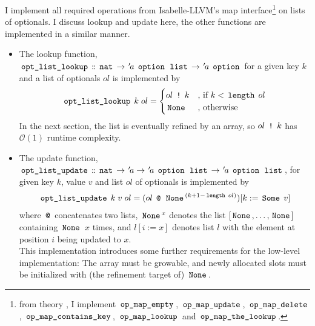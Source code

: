 I implement all required operations from Isabelle-LLVM's map interface\footnote{from theory , I implement $\,\text{\ttfamily op\_map\_empty}\,$, $\,\text{\ttfamily op\_map\_update}\,$, $\,\text{\ttfamily op\_map\_delete}\,$, $\,\text{\ttfamily op\_map\_contains\_key}\,$, $\,\text{\ttfamily op\_map\_lookup}\,$ and $\,\text{\ttfamily op\_map\_the\_lookup}\,$.} on lists of optionals.
I discuss lookup and update here, the other functions are implemented in a similar manner.
\begin{itemize}
	\item The lookup function, $\,\text{\ttfamily opt\_list\_lookup}\, \mathrel{\mathord{:}\mkern-1.2mu\mathord{:}} \,\text{\ttfamily nat}\, \rightarrow {\mskip2mu '\mskip-2mua} \; \,\text{\ttfamily option}\, \; \,\text{\ttfamily list}\, \rightarrow {\mskip2mu '\mskip-2mua} \; \,\text{\ttfamily option}\,$ for a given key $k$ and a list of optionals $ol$ is implemented by
	      \begin{gather*}
		      \,\text{\ttfamily opt\_list\_lookup}\, \; k \; ol =
		      \begin{cases}
			      ol \; \,\text{\ttfamily !}\, \; k & \text{, if $k < \,\text{\ttfamily length}\, \; ol$} \\
			      \,\text{\ttfamily None}\,             & \text{, otherwise}
		      \end{cases}
	      \end{gather*}
	      In the next section, the list is eventually refined by an array, so $ol \; \,\text{\ttfamily !}\, \; k$ has $\mathcal{O}(1)$ runtime complexity.
	\item The update function, $\,\text{\ttfamily opt\_list\_update}\, \mathrel{\mathord{:}\mkern-1.2mu\mathord{:}} \,\text{\ttfamily nat}\, \rightarrow {\mskip2mu '\mskip-2mua} \rightarrow {\mskip2mu '\mskip-2mua} \; \,\text{\ttfamily option}\, \; \,\text{\ttfamily list}\, \rightarrow {\mskip2mu '\mskip-2mua} \; \,\text{\ttfamily option}\, \; \,\text{\ttfamily list}\,$, for given key $k$, value $v$ and list $ol$ of optionals is implemented by
	      \begin{gather*}
		      \,\text{\ttfamily opt\_list\_update}\, \; k \; v \; ol = (ol \; \,\text{\ttfamily @}\, \; \,\text{\ttfamily None}\,^{(k + 1 - \,\text{\ttfamily length}\, \; ol)})[k:=\,\text{\ttfamily Some}\, \; v]
	      \end{gather*}
	      where $\,\text{\ttfamily @}\,$ concatenates two lists, $\,\text{\ttfamily None}\,^x$ denotes the list $[\,\text{\ttfamily None}\,,\dots,\,\text{\ttfamily None}\,]$ containing $\,\text{\ttfamily None}\,$ $x$ times, and $l[i:=x]$ denotes list $l$ with the element at position $i$ being updated to $x$.\\
	      This implementation introduces some further requirements for the low-level implementation: The array must be growable, and newly allocated slots must be initialized with (the refinement target of) $\,\text{\ttfamily None}\,$.
\end{itemize}

